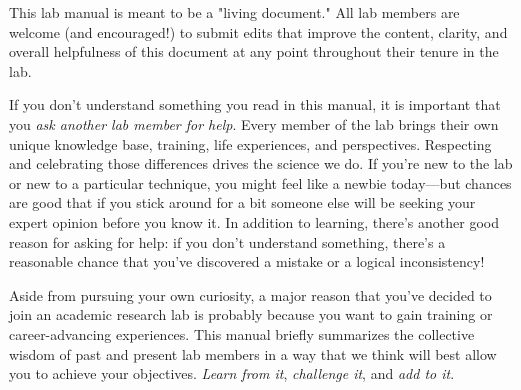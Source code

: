 \documentclass{tufte-book} %
\begin{document}
\noindent This lab manual is meant to be a "living document." All lab members are welcome (and encouraged!) to submit edits that improve the content, clarity, and overall helpfulness of this document at any point throughout their tenure in the lab.


\noindent {} If you don't understand something you
read in this manual, it is important that you \textit{ask another lab
  member for help}.  Every member of the lab brings their own unique
knowledge base, training, life experiences, and perspectives.
Respecting and celebrating those differences drives the science we do.
If you're new to the lab or new to a particular technique, you might
feel like a newbie today---but chances are good that if you stick
around for a bit someone else will be seeking your expert opinion
before you know it.  In addition to learning, there's another good
reason for asking for help: if you don't understand something, there's
a reasonable chance that you've discovered a mistake or a logical
inconsistency!

Aside from pursuing your own curiosity, a major reason that you've
decided to join an academic research lab is probably because you want
to gain training or career-advancing experiences.  This manual briefly
summarizes the collective wisdom of past and present lab members in a
way that we think will best allow you to achieve your objectives.
\textit{Learn from it}, \textit{challenge it}, and \textit{add to it}.

\end{document}
